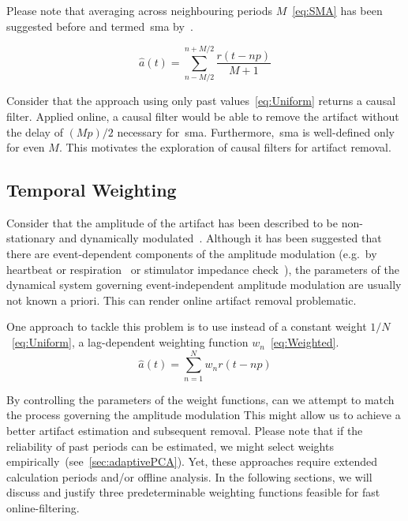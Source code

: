 \documentclass[a4paper]{article}
\newcommand{\secref}[1]{(see~\ref{#1})}
\begin{document}
Please note that averaging across neighbouring periods $M$~\eqref{eq:SMA} has been suggested before and termed~\gls{sma} by~\cite{Kohli_2015}.

\begin{equation}
    \hat{a}(t) = \sum_{n-M/2}^{n+M/2} \frac{r(t - np)}{M+1}\label{eq:SMA}
\end{equation}

Consider that the approach using only past values~\eqref{eq:Uniform} returns a causal filter. Applied online, a causal filter would be able to remove the artifact without the delay of $(Mp)/2$ necessary for~\gls{sma}. Furthermore,~\gls{sma} is well-defined only for even $M$. This motivates the exploration of causal filters for artifact removal.

\subsection{Temporal Weighting}

Consider that the amplitude of the  artifact has been described to be non-stationary and dynamically modulated~\citep{Noury_2016,Neuling_2017}.
Although it has been suggested that there are event-dependent components of the amplitude modulation (e.g.\ by heartbeat or respiration~\cite{Noury_2016} or stimulator impedance check~\cite{Neuling_2017}), the parameters of the dynamical system governing event-independent amplitude modulation are usually not known a priori. This can render online artifact removal problematic.

One approach to tackle this problem is to use instead of a constant weight $1/N$~\eqref{eq:Uniform}, a lag-dependent weighting function $w_n$~\eqref{eq:Weighted}.
\begin{equation}
    \hat{a}(t) = \sum_{n=1}^{N} w_n r(t - np)\label{eq:Weighted}
\end{equation}

By controlling the parameters of the weight functions, can we attempt to match the process governing the amplitude modulation
This might allow us to achieve a better artifact estimation and subsequent removal. Please note that if the reliability of past periods can be estimated, we might select weights empirically~\secref{sec:adaptivePCA}.
Yet, these approaches require extended calculation periods and/or offline analysis. In the following sections, we will discuss and justify three predeterminable weighting functions feasible for fast online-filtering.
\end{document}
